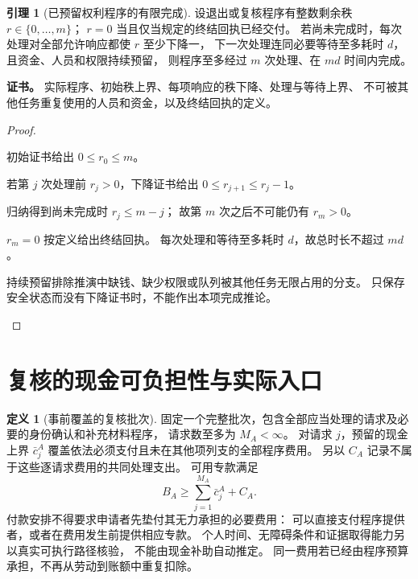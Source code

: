 \documentclass[UTF8,12pt,a4paper,openany,fontset=none,zihao=false]{ctexrep}
\theoremstyle{definition}
\newtheorem{definition}{定义}[chapter]
\newtheorem{lemma}{引理}[chapter]
\newenvironment{certificate}{\par\noindent\textbf{证书。}\ignorespaces}{\par}
\newcommand{\1}{\mathbf 1}
\begin{document}
\begin{lemma}[已预留权利程序的有限完成]
\label{rights:procedure}
设退出或复核程序有整数剩余秩 \(r\in\{0,\ldots,m\}\)；
\(r=0\) 当且仅当规定的终结回执已经交付。
若尚未完成时，每次处理对全部允许响应都使 \(r\) 至少下降一，
下一次处理连同必要等待至多耗时 \(d\)，且资金、人员和权限持续预留，
则程序至多经过 \(m\) 次处理、在 \(md\) 时间内完成。
\end{lemma}
\begin{certificate}
实际程序、初始秩上界、每项响应的秩下降、处理与等待上界、
不可被其他任务重复使用的人员和资金，以及终结回执的定义。
\end{certificate}
\begin{proof}
\begin{semanticsteps}
\item 初始证书给出 \(0\le r_0\le m\)。
\item 若第 \(j\) 次处理前 \(r_j>0\)，下降证书给出
\(0\le r_{j+1}\le r_j-1\)。
\item 归纳得到尚未完成时 \(r_j\le m-j\)；
故第 \(m\) 次之后不可能仍有 \(r_m>0\)。
\item \(r_m=0\) 按定义给出终结回执。
每次处理和等待至多耗时 \(d\)，故总时长不超过 \(md\)。
\item 持续预留排除推演中缺钱、缺少权限或队列被其他任务无限占用的分支。
只保存安全状态而没有下降证书时，不能作出本项完成推论。
\end{semanticsteps}
\end{proof}

\section{复核的现金可负担性与实际入口}

\begin{definition}[事前覆盖的复核批次]
\label{rights:review-budget}
固定一个完整批次，包含全部应当处理的请求及必要的身份确认和补充材料程序，
请求数至多为 \(M_A<\infty\)。
对请求 \(j\)，预留的现金上界 \(\bar c_j^A\) 覆盖依法必须支付且未在其他项列支的全部程序费用。
另以 \(C_A\) 记录不属于这些逐请求费用的共同处理支出。
可用专款满足
\[
B_A\ge\sum_{j=1}^{M_A}\bar c_j^A+C_A.
\]
付款安排不得要求申请者先垫付其无力承担的必要费用：
可以直接支付程序提供者，或者在费用发生前提供相应专款。
个人时间、无障碍条件和证据取得能力另以真实可执行路径核验，
不能由现金补助自动推定。
同一费用若已经由程序预算承担，不再从劳动到账额中重复扣除。
\end{definition}
\end{document}
